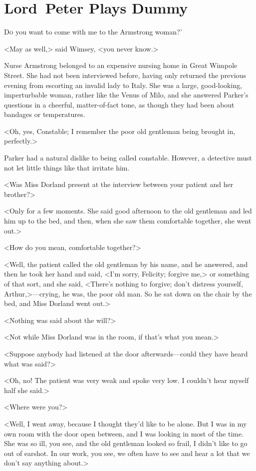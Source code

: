 \chapter{Lord~Peter Plays Dummy}
\lettrine[ante=‘]{D}{o} you want to come with me to the Armstrong woman?'

\zz
<May as well,> said Wimsey, <you never know.>

\zz
Nurse Armstrong belonged to an expensive nursing home in Great Wimpole Street. She had not been interviewed before, having only returned the previous evening from escorting an invalid lady to Italy. She was a large, good-looking, imperturbable woman, rather like the Venus of Milo, and she answered Parker's questions in a cheerful, matter-of-fact tone, as though they had been about bandages or temperatures.

<Oh, yes, Constable; I remember the poor old gentleman being brought in, perfectly.>

Parker had a natural dislike to being called constable. However, a detective must not let little things like that irritate him.

<Was Miss Dorland present at the interview between your patient and her brother?>

<Only for a few moments. She said good afternoon to the old gentleman and led him up to the bed, and then, when she saw them comfortable together, she went out.>

<How do you mean, comfortable together?>

<Well, the patient called the old gentleman by his name, and he answered, and then he took her hand and said, <I'm sorry, Felicity; forgive me,> or something of that sort, and she said, <There's nothing to forgive; don't distress yourself, Arthur,>—crying, he was, the poor old man. So he sat down on the chair by the bed, and Miss Dorland went out.>

<Nothing was said about the will?>

<Not while Miss Dorland was in the room, if that's what you mean.>

<Suppose anybody had listened at the door afterwards—could they have heard what was said?>

<Oh, no! The patient was very weak and spoke very low. I couldn't hear myself half she said.>

<Where were you?>

<Well, I went away, because I thought they'd like to be alone. But I was in my own room with the door open between, and I was looking in most of the time. She was so ill, you see, and the old gentleman looked so frail, I didn't like to go out of earshot. In our work, you see, we often have to see and hear a lot that we don't say anything about.>

